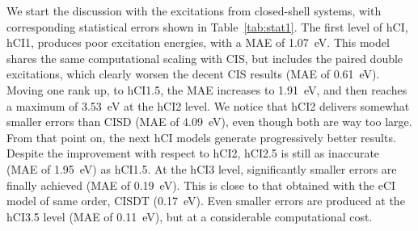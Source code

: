 \documentclass[aip,jcp,reprint,noshowkeys,superscriptaddress]{revtex4-1}
\begin{document}
We start the discussion with the excitations from closed-shell systems, with corresponding statistical errors shown in Table~\ref{tab:stat1}.
The first level of hCI, hCI1, produces poor excitation energies, with a MAE of \SI{1.07}{\eV}.
This model shares the same computational scaling with CIS, but includes the paired double excitations,
which clearly worsen the decent CIS results (MAE of \SI{0.61}{\eV}).
Moving one rank up, to hCI1.5, the MAE increases to \SI{1.91}{\eV}, and then reaches a maximum of \SI{3.53}{\eV} at the hCI2 level.
We notice that hCI2 delivers somewhat smaller errors than CISD (MAE of \SI{4.09}{\eV}), even though both are way too large.
From that point on, the next hCI models generate progressively better results.
Despite the improvement with respect to hCI2, hCI2.5 is still as inaccurate (MAE of \SI{1.95}{\eV}) as hCI1.5.
At the hCI3 level, significantly smaller errors are finally achieved (MAE of \SI{0.19}{\eV}).
This is close to that obtained with the eCI model of same order, CISDT (\SI{0.17}{\eV}).
Even smaller errors are produced at the hCI3.5 level (MAE of \SI{0.11}{\eV}), but at a considerable computational cost.

\end{document}
